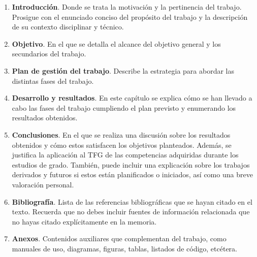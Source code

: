 \begin{enumerate}
\item \textbf{Introducción}. Donde se trata la motivación y la pertinencia del trabajo. Prosigue con el enunciado conciso del propósito del trabajo y la descripción de su contexto disciplinar y técnico.

\item \textbf{Objetivo}. En el que se detalla el alcance del objetivo general y los secundarios del trabajo.

\item \textbf{Plan de gestión del trabajo}. Describe la estrategia para abordar las distintas fases del trabajo. 

\item \textbf{Desarrollo y resultados}. En este capítulo se explica cómo se han llevado a cabo las fases del trabajo cumpliendo el plan previsto y enumerando los resultados obtenidos.

\item \textbf{Conclusiones}. En el que se realiza una discusión sobre los resultados obtenidos y cómo estos satisfacen los objetivos planteados. Además, se justifica la aplicación al TFG de las competencias adquiridas durante los estudios de grado. También, puede incluir una explicación sobre los trabajos derivados y futuros si estos están planificados o iniciados, así como una breve valoración personal.

\item \textbf{Bibliografía}. Lista de las referencias bibliográficas que se hayan citado en el texto. Recuerda que no debes incluir fuentes de información relacionada que no hayas citado explícitamente en la memoria.

\item \textbf{Anexos}. Contenidos auxiliares que complementan del trabajo, como manuales de uso, diagramas, figuras, tablas, listados de código, etcétera.
\end{enumerate}









